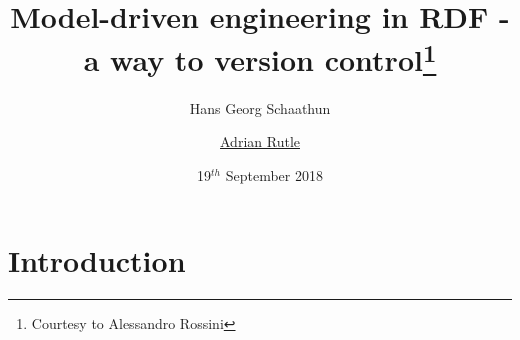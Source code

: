 \documentclass[dvips,slidetop,mathserif,red]{beamer}
\begin{document}
\title{Model-driven engineering in RDF - a way to version control\footnote{Courtesy to Alessandro Rossini}}

\subject{Model-driven engineering in RDF - a way to version control}

\author[Adrian Rutle]{Hans Georg Schaathun \and \underline{Adrian Rutle}}


\date[19 Sept 2018]{19$^{th}$ September 2018}


\section{Introduction}

\begin{frame}
  \titlepage
\end{frame}

\end{document}
